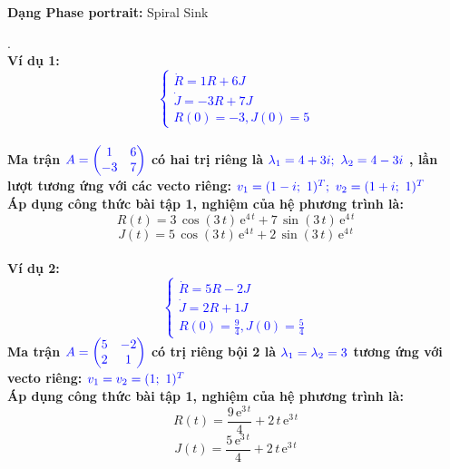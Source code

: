 \textbf{Dạng Phase portrait: } Spiral Sink
\pagebreak
\begin{tcbdoublebox}[title={5. Eager Beaver and Narcissistic Nerd}]
\mdseries .\\
\bfseries Ví dụ 1: \\
\textcolor{blue}{$$\left\{\begin{matrix}
\dot{R} =  1R +6J \\ 
\dot{J} =  -3R+7J\\ 
R(0)= -3, J(0)=5
\end{matrix}\right.$$}\\
\mdseries Ma trận $\color{blue}A=\begin{pmatrix}
1 & 6\\ 
-3 & 7
\end{pmatrix}$ có hai trị riêng là 
$\color{blue}\lambda_{1}=4+3i;\ \lambda_{2}=4-3i$
, lần lượt tương ứng với các vecto riêng:
$\color{blue}v_{1} = (1-i;\ 1)^{T};\ v_{2}=(1+i;\ 1)^{T}$\\Áp dụng công thức bài tập 1, nghiệm của hệ phương trình là:
$$R(t)=3\,\cos\left(3\,t\right)\,{\mathrm{e}}^{4\,t}+7\,\sin\left(3\,t\right)\,{\mathrm{e}}^{4\,t} $$
$$J(t)=5\,\cos\left(3\,t\right)\,{\mathrm{e}}^{4\,t}+2\,\sin\left(3\,t\right)\,{\mathrm{e}}^{4\,t}$$
\\
\bfseries Ví dụ 2:\\
\textcolor{blue}{$$\left\{\begin{matrix}
\dot{R} = 5R -2J \\ 
\dot{J} =  2R +1J\\ 
R(0)= \frac{9}{4}, J(0)=\frac{5}{4}
\end{matrix}\right.$$}
\mdseries Ma trận $\color{blue}A=\begin{pmatrix}
5 & -2\\ 
2 & 1
\end{pmatrix}$ có trị riêng bội 2 là 
$\color{blue}\lambda_{1}=\lambda_{2}=3$ tương ứng với vecto riêng:
$\color{blue}v_{1} = v_{2}=(1;\ 1)^{T}$\\Áp dụng công thức bài tập 1, nghiệm của hệ phương trình là:
$$R(t)=\frac{9\,{\mathrm{e}}^{3\,t}}{4}+2\,t\,{\mathrm{e}}^{3\,t}$$
$$J(t)=\frac{5\,{\mathrm{e}}^{3\,t}}{4}+2\,t\,{\mathrm{e}}^{3\,t}$$

\end{tcbdoublebox}
\pagebreak
